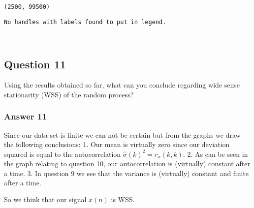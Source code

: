 \documentclass[11pt]{article}
\begin{document}
    \begin{Verbatim}[commandchars=\\\{\}]
(2500, 99500)
    \end{Verbatim}

    \begin{Verbatim}[commandchars=\\\{\}]
No handles with labels found to put in legend.
    \end{Verbatim}

    \begin{center}
    \end{center}
    { \hspace*{\fill} \\}
    
    \hypertarget{question-11}{%
\subsection{Question 11}\label{question-11}}

Using the results obtained so far, what can you conclude regarding wide
sense stationarity (WSS) of the random process?

    \hypertarget{answer-11}{%
\subsubsection{Answer 11}\label{answer-11}}

Since our data-set is finite we can not be certain but from the graphs
we draw the following conclusions: 1. Our mean is virtually zero since
our deviation squared is equal to the autocorrelation
\(\hat{\sigma}(k)^2 = r_x(k,k)\). 2. As can be seen in the graph
relating to question 10, our autocorrelation is (virtually) constant
after a time. 3. In question 9 we see that the variance is (virtually)
constant and finite after a time.

So we think that our signal \(x(n)\) is WSS.


    
    
    
\end{document}
